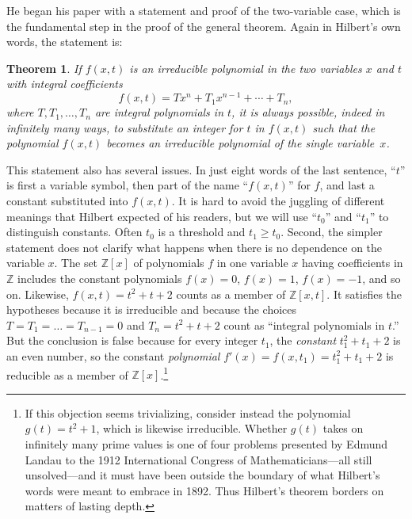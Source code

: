 \documentclass{article}
\theoremstyle{plain}
\newtheorem{thm}{Theorem}
\theoremstyle{definition}
\renewcommand{\geq}{\geqslant}  %
\newcommand{\Zed}{\mathbb{Z}}   %
\begin{document}
He began his paper \cite{Hilbert1892} with a statement and proof of
the two-variable case, which is the fundamental step in the proof of
the general theorem. Again in Hilbert's own words, the statement is:


\begin{thm} %
\label{irreducibility-1}
If $f(x,t)$ is an irreducible polynomial in the two variables $x$ and
$t$ with integral coefficients
\begin{equation}\label{integral-T}
f(x,t) = T x^n + T_1 x^{n-1} +\cdots+ T_n,
\end{equation}
where $T,T_1,\dots,T_n$ are integral polynomials in $t$, it is always
possible, indeed in infinitely many ways, to substitute an integer for
$t$ in $f(x,t)$ such that the polynomial $f(x,t)$ becomes an
irreducible polynomial of the single variable~$x$.
\end{thm}

\noindent 
This statement also has several issues.  In just eight words of the last sentence, ``$t$'' is first a variable symbol, then part of the name ``$f(x,t)$'' for $f$, and last a constant substituted into $f(x,t)$.  It is hard to avoid the juggling of different meanings that Hilbert expected of his readers, but we will use ``$t_0$'' and ``$t_1$'' to distinguish constants.  Often $t_0$ is a threshold and $t_1 \geq t_0$.  Second, the simpler statement does not clarify what happens when there is no dependence on the variable $x$.  The set $\Zed[x]$ of polynomials $f$ in one variable $x$ having coefficients in $\Zed$ includes the constant polynomials $f(x) = 0$, $f(x) = 1$, $f(x) = -1$, and so on.  Likewise, $f(x,t) = t^2 + t + 2$ counts as a member of $\Zed[x,t]$.  It satisfies the hypotheses because it is irreducible and because the choices $T = T_1 = \dots = T_{n-1} = 0$ and $T_n = t^2 + t + 2$ count as ``integral polynomials in $t$.''  But the conclusion is false because for every integer $t_1$, the \emph{constant} $t_1^2 + t_1 + 2$ is an even number, so the constant \emph{polynomial} $f'(x) = f(x,t_1) = t_1^2 + t_1 + 2$ is reducible as a member of $\Zed[x]$.\footnote{
%
If this objection seems trivializing, consider instead the polynomial $g(t) =  t^2 + 1$, which is likewise irreducible.  Whether $g(t)$ takes on infinitely many prime values is one of four problems presented by Edmund Landau to the 1912 International Congress of Mathematicians---all still unsolved---and it must have been outside the boundary of what Hilbert's words were meant to embrace in 1892.  Thus Hilbert's theorem borders on matters of lasting depth.
} %
\end{document}
